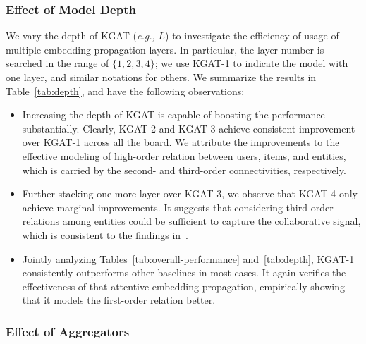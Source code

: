 \documentclass[sigconf]{acmart}
\newcommand{\eg}{\emph{e.g., }}
\theoremstyle{definition}
\begin{document}
\subsubsection{\textbf{Effect of Model Depth}}\label{sec:layer-depth}
We vary the depth of KGAT (\eg $L$) to investigate the efficiency of usage of multiple embedding propagation layers.
In particular, the layer number is searched in the range of $\{1,2,3,4\}$; we use KGAT-1 to indicate the model with one layer, and similar notations for others.
We summarize the results in Table~\ref{tab:depth}, and have the following observations:
\begin{itemize}[leftmargin=*]
    \item Increasing the depth of KGAT is capable of boosting the performance substantially. Clearly, KGAT-2 and KGAT-3 achieve consistent improvement over KGAT-1 across all the board. We attribute the improvements to the effective modeling of high-order relation between users, items, and entities, which is carried by the second- and third-order connectivities, respectively.
    
    \item Further stacking one more layer over KGAT-3, we observe that KGAT-4 only achieve marginal improvements. It suggests that considering third-order relations among entities could be sufficient to capture the collaborative signal, which is consistent to the findings in~\cite{KGreasoning19,MCRec}.
    
    \item Jointly analyzing Tables~\ref{tab:overall-performance} and~\ref{tab:depth}, KGAT-1 consistently outperforms other baselines in most cases. It again verifies the effectiveness of that attentive embedding propagation, empirically showing that it models the first-order relation better.
\end{itemize}

\subsubsection{\textbf{Effect of Aggregators}}\label{sec:aggregator}
\end{document}
